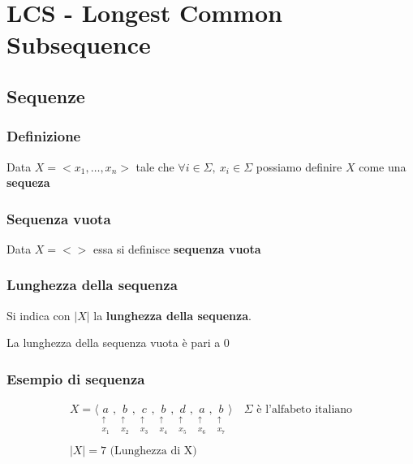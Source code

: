 \chapter{LCS - Longest Common Subsequence}
\section{Sequenze}
    \subsection{Definizione}
    Data $X = <x_1, \dots, x_n>$ tale che $\forall i \in \Sigma,\ x_i \in \Sigma$ possiamo definire $X$ come una \textbf{sequeza}

    \subsection{Sequenza vuota}
    Data $X = <>$ essa si definisce \textbf{sequenza vuota}

    \subsection{Lunghezza della sequenza}
    Si indica con $|X|$ la \textbf{lunghezza della sequenza}.

    La lunghezza della sequenza vuota è pari a 0

    \subsection{Esempio di sequenza}
    { 
        \Large

        \begin{gather*}
            X = \langle 
            \underset{\substack{\uparrow \\ x_1}}{a}, 
            \underset{\substack{\uparrow \\ x_2}}{b}, 
            \underset{\substack{\uparrow \\ x_3}}{c}, 
            \underset{\substack{\uparrow \\ x_4}}{b}, 
            \underset{\substack{\uparrow \\ x_5}}{d}, 
            \underset{\substack{\uparrow \\ x_6}}{a}, 
            \underset{\substack{\uparrow \\ x_7}}{b} 
            \rangle \quad \Sigma \text{ è l'alfabeto italiano} \\ \\
            |X| = 7 \text{ (Lunghezza di X)}
        \end{gather*}
    }



